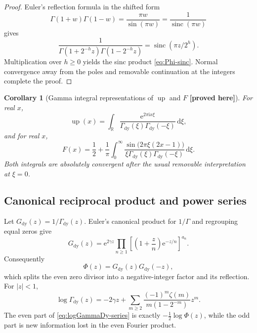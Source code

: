 \documentclass[11pt,oneside]{article}
\newtheorem{corollary}[theorem]{Corollary}
\theoremstyle{definition}
\theoremstyle{remark}
\newcommand{\R}{\mathbb R}
\newcommand{\Up}{\operatorname{up}}
\newcommand{\sinc}{\operatorname{sinc}}
\newcommand{\e}{\mathrm e}
\newcommand{\ii}{\mathrm i}
\newcommand{\dd}{\,\mathrm d}
\newcommand{\GammaDy}{\Gamma_{\!\mathrm{dy}}}
\newcommand{\New}{\textcolor{amber}{\textbf{[proved here]}}}
\begin{document}
\begin{proof}
Euler's reflection formula in the shifted form
\begin{equation}
 \Gamma(1+w)\Gamma(1-w)=\frac{\pi w}{\sin(\pi w)}
 =\frac{1}{\sinc(\pi w)}                                  \label{eq:gamma-reflection}
\end{equation}
gives
\[
 \frac{1}{\Gamma(1+2^{-h}z)\Gamma(1-2^{-h}z)}
 =\sinc(\pi z/2^h).
\]
Multiplication over $h\ge0$ yields the sinc product \eqref{eq:Phi-sinc}.  Normal convergence
away from the poles and removable continuation at the integers complete the proof.
\end{proof}

\begin{corollary}[Gamma integral representations of $\Up$ and $F$ \New]
For real $x$,
\begin{equation}
 \Up(x)=\int_{\R}
 \frac{\e^{2\pi\ii x\xi}}
 {\GammaDy(\xi)\GammaDy(-\xi)}\dd\xi,                    \label{eq:up-GammaDy-integral}
\end{equation}
and for real $x$,
\begin{equation}
 F(x)=\frac12+\frac1\pi\int_0^\infty
 \frac{\sin\bigl(2\pi\xi(2x-1)\bigr)}
 {\xi\GammaDy(\xi)\GammaDy(-\xi)}\dd\xi.              \label{eq:F-GammaDy-integral}
\end{equation}
Both integrals are absolutely convergent after the usual removable interpretation at
$\xi=0$.
\end{corollary}

\subsection{Canonical reciprocal product and power series}

Let $G_{\mathrm{dy}}(z)=1/\GammaDy(z)$.  Euler's canonical product for $1/\Gamma$ and
regrouping equal zeros give
\begin{equation}
 \boxed{\quad
 G_{\mathrm{dy}}(z)
 =\e^{2\gamma z}
 \prod_{n\ge1}\left[\left(1+\frac{z}{n}\right)
 \e^{-z/n}\right]^{a_n}.
 \quad}                                                  \label{eq:Gdy-canonical}
\end{equation}
Consequently
\begin{equation}
 \Phi(z)=G_{\mathrm{dy}}(z)G_{\mathrm{dy}}(-z),          \label{eq:Phi-Gdy}
\end{equation}
which splits the even zero divisor into a negative-integer factor and its reflection.
For $|z|<1$,
\begin{equation}
 \boxed{\quad
 \log\GammaDy(z)
 =-2\gamma z+
 \sum_{m\ge2}\frac{(-1)^m\zeta(m)}{m(1-2^{-m})}z^m.
 \quad}                                                  \label{eq:logGammaDy-series}
\end{equation}
The even part of \eqref{eq:logGammaDy-series} is exactly
$-\tfrac12\log\Phi(z)$, while the odd part is new information lost in the even Fourier
product.
\end{document}
